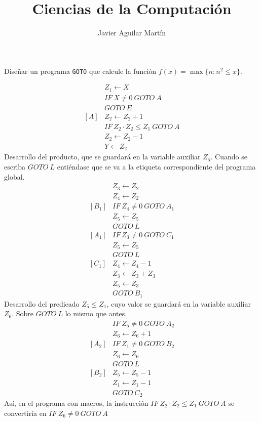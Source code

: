 \documentclass[twoside]{article}
\begin{document}
\title{Ciencias de la Computación}

\author{Javier Aguilar Martín}
\maketitle

\begin{ejercicio}{3}
Diseñar un programa \texttt{GOTO} que calcule la función $f(x) = \max\{n : n^2 \leq x\}$.
\end{ejercicio}
\begin{solucion}
\begin{align*}
& Z_1\leftarrow X\\
&IF\ X\neq 0\ GOTO\ A\\
&GOTO\ E\\
[A] & Z_2\leftarrow Z_2+1\\
& IF\ Z_2\cdot Z_2 \leq Z_1\ GOTO\ A\\
& Z_2\leftarrow Z_2-1\\
& Y\leftarrow Z_2
\end{align*}
Desarrollo del producto, que se guardará en la variable auxiliar $Z_5$. Cuando se escriba $GOTO\ L$ entiéndase que se va a la etiqueta correspondiente del programa global.
\begin{align*}
&Z_3\leftarrow Z_2\\
&Z_4\leftarrow Z_2\\
[B_1] & IF\ Z_4\neq 0\ GOTO\ A_1\\
& Z_5\leftarrow Z_5\\
& GOTO\ L\\
[A_1] & IF\ Z_3\neq 0\ GOTO\ C_1\\
& Z_5\leftarrow Z_5\\
& GOTO\ L\\
[C_1] & Z_4\leftarrow Z_4-1\\
& Z_3\leftarrow Z_3+Z_3\\
&Z_5\leftarrow Z_3\\
& GOTO\ B_1
\end{align*}
Desarrollo del predicado $Z_5\leq Z_1$, cuyo valor se guardará en la variable auxiliar $Z_6$. Sobre $GOTO\ L$ lo mismo que antes.
\begin{align*}
[C_2]& IF\ Z_5\neq 0\ GOTO\ A_2\\
& Z_6\leftarrow Z_6+1\\
[A_2] & IF\ Z_1\neq 0\ GOTO\ B_2\\
& Z_6\leftarrow Z_6\\
&GOTO\ L\\
[B_2] & Z_5\leftarrow Z_5- 1\\
& Z_1\leftarrow Z_1-1\\
&GOTO\ C_2
\end{align*}
Así, en el programa con macros, la instrucción $IF\ Z_2\cdot Z_2 \leq Z_1\ GOTO\ A$ se convertiría en $IF\ Z_6\neq 0\ GOTO\ A$
\end{solucion}
\end{document}
